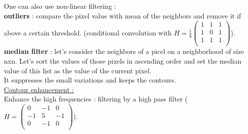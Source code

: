 \documentclass[../main.tex]{subfiles}
\begin{document}
One can also use non-linear filtering : \\
\textbf{outliers} : compare the pixel value with mean of the neighbors and remove it if above a certain threshold. (conditional convolution with $H = \frac{1}{8} \begin{pmatrix}
    1 & 1 &1\\ 1 & 0 &1 \\ 1&1&1\\
\end{pmatrix}$).\\
\textbf{median filter} : let's consider the neighbors of a picel on a neighborhood of size nxn. Let's sort the values of those pixels in ascending order and set the median value of this list as the value of the current pixel.\\
\warning It suppresses the small variations and keeps the contours.\\

\quad \underline{Contour enhancement :}\\
Enhance the high frequencies : filtering by a high pass filter ($H = \begin{pmatrix}
    0 & -1 &0\\ -1 & 5 &-1 \\ 0&-1&0\\
\end{pmatrix}$).\\
\end{document}
